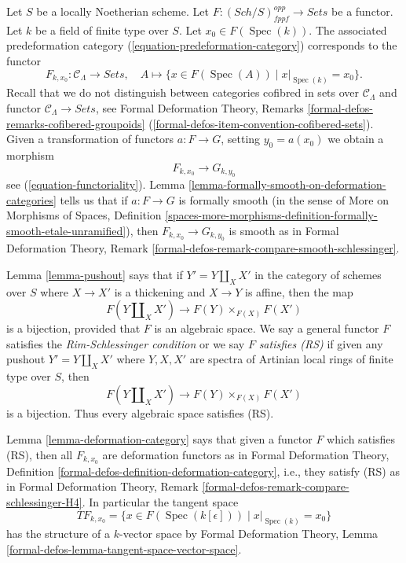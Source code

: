 \documentclass{stacks-project}
\theoremstyle{plain}
\theoremstyle{definition}
\theoremstyle{remark}
\numberwithin{equation}{subsection}
\def\Spec{\mathop{\mathrm{Spec}}}
\def\Sch{\mathit{Sch}}
\begin{document}
\medskip\noindent
Let $S$ be a locally Noetherian scheme. Let
$F : (\Sch/S)_{fppf}^{opp} \to \textit{Sets}$ be a functor. Let $k$ be
a field of finite type over $S$. Let $x_0 \in F(\Spec(k))$.
The associated predeformation category (\ref{equation-predeformation-category})
corresponds to the functor
$$
F_{k, x_0} : \mathcal{C}_\Lambda \longrightarrow \textit{Sets},
\quad
A \longmapsto \{x \in F(\Spec(A)) \mid x|_{\Spec(k)} = x_0 \}.
$$
Recall that we do not distinguish between
categories cofibred in sets over $\mathcal{C}_\Lambda$
and functor $\mathcal{C}_\Lambda \to \textit{Sets}$,
see Formal Deformation Theory, Remarks
\ref{formal-defos-remarks-cofibered-groupoids}
(\ref{formal-defos-item-convention-cofibered-sets}).
Given a transformation of functors $a : F \to G$, setting
$y_0 = a(x_0)$ we obtain a morphism
$$
F_{k, x_0} \longrightarrow G_{k, y_0}
$$
see (\ref{equation-functoriality}).
Lemma \ref{lemma-formally-smooth-on-deformation-categories} tells us that if
$a : F \to G$ is formally smooth (in the sense of
More on Morphisms of Spaces, Definition
\ref{spaces-more-morphisms-definition-formally-smooth-etale-unramified}), then
$F_{k, x_0} \longrightarrow G_{k, y_0}$ is smooth as
in Formal Deformation Theory, Remark
\ref{formal-defos-remark-compare-smooth-schlessinger}.

\medskip\noindent
Lemma \ref{lemma-pushout} says that if $Y' = Y \amalg_X X'$ in the
category of schemes over $S$ where $X \to X'$ is a thickening and
$X \to Y$ is affine, then the map
$$
F(Y \amalg_X X') \to F(Y) \times_{F(X)} F(X')
$$
is a bijection, provided that $F$ is an algebraic space.
We say a general functor $F$ satisfies the {\it Rim-Schlessinger condition}
or we say $F$ {\it satisfies (RS)} if given any
pushout $Y' = Y \amalg_X X'$ where $Y, X, X'$ are spectra of Artinian
local rings of finite type over $S$, then
$$
F(Y \amalg_X X') \to F(Y) \times_{F(X)} F(X')
$$
is a bijection. Thus every algebraic space satisfies (RS).

\medskip\noindent
Lemma \ref{lemma-deformation-category} says that
given a functor $F$ which satisfies (RS), then all $F_{k, x_0}$
are deformation functors as in
Formal Deformation Theory, Definition
\ref{formal-defos-definition-deformation-category}, i.e., they satisfy
(RS) as in
Formal Deformation Theory, Remark
\ref{formal-defos-remark-compare-schlessinger-H4}.
In particular the tangent space
$$
TF_{k, x_0} = \{x \in F(\Spec(k[\epsilon])) \mid x|_{\Spec(k)} = x_0\}
$$
has the structure of a $k$-vector space by Formal Deformation Theory,
Lemma \ref{formal-defos-lemma-tangent-space-vector-space}.
\end{document}
